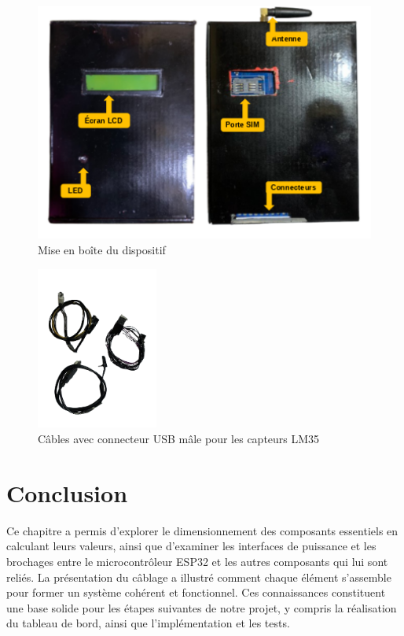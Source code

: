 \begin{figure}[H]
	\centering
	\includegraphics[width=17cm]{./img/dispo3.png}
\caption{Mise en boîte du dispositif}
\end{figure}
\begin{figure}[H]
	\centering
	\includegraphics[width=4cm]{./img/cable.png}
\caption{Câbles avec connecteur USB mâle pour les capteurs LM35}

\end{figure}

\section{Conclusion}

Ce chapitre a permis d'explorer le dimensionnement des composants essentiels en calculant leurs valeurs, ainsi que d'examiner les interfaces de puissance et les brochages entre le microcontrôleur ESP32 et les autres composants qui lui sont reliés. La présentation du câblage a illustré comment chaque élément s'assemble pour former un système cohérent et fonctionnel. Ces connaissances constituent une base solide pour les étapes suivantes de notre projet, y compris la réalisation du tableau de bord, ainsi que l'implémentation et les tests.

